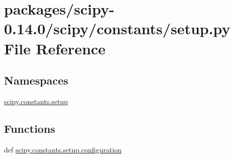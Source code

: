 \hypertarget{packages_2scipy-0_814_80_2scipy_2constants_2setup_8py}{}\section{packages/scipy-\/0.14.0/scipy/constants/setup.py File Reference}
\label{packages_2scipy-0_814_80_2scipy_2constants_2setup_8py}
\subsection*{Namespaces}
\begin{DoxyCompactItemize}
\item 
 \hyperlink{namespacescipy_1_1constants_1_1setup}{scipy.\+constants.\+setup}
\end{DoxyCompactItemize}
\subsection*{Functions}
\begin{DoxyCompactItemize}
\item 
def \hyperlink{namespacescipy_1_1constants_1_1setup_ae1b054d46b8561a39465ff4afa0d6f7d}{scipy.\+constants.\+setup.\+configuration}
\end{DoxyCompactItemize}
